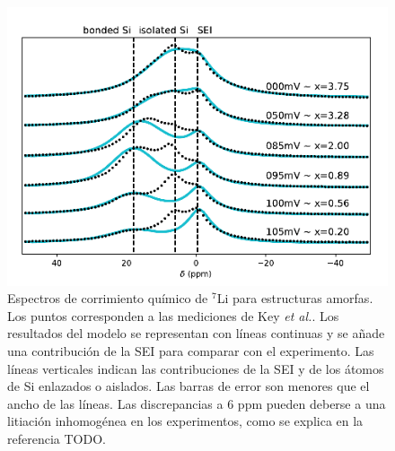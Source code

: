 \begin{figure}[h!]
    \centering
    \includegraphics[width=.7\textwidth]{Silicio/prediccion/resultados/nmr/a-nmr.png}
    \caption{Espectros de corrimiento químico de $^7$Li para estructuras amorfas.
    Los puntos corresponden a las mediciones de Key \textit{et al.}. Los 
    resultados del modelo se representan con líneas continuas y se añade una 
    contribución de la SEI para comparar con el experimento. Las líneas verticales 
    indican las contribuciones de la SEI y de los átomos de Si enlazados o 
    aislados. Las barras de error son menores que el ancho de las líneas. Las 
    discrepancias a 6 ppm pueden deberse a una litiación inhomogénea en los 
    experimentos, como se explica en la referencia TODO.} 
    \label{fig:a-nmr}
\end{figure}
